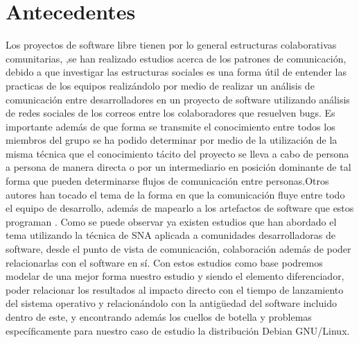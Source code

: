 \documentclass[letterpaper,12pt,titlepage]{report}
\begin{document}
\chapter{Antecedentes}
Los proyectos de software libre tienen por lo general estructuras
colaborativas comunitarias,
 ,se han realizado estudios acerca de los
patrones de comunicación, debido a que investigar las estructuras
sociales es una forma útil de entender las practicas de los equipos
realizándolo por medio de realizar un análisis de comunicación entre
desarrolladores en un proyecto de software utilizando análisis de
redes sociales de los correos entre los colaboradores que resuelven
bugs\cite{crowston2005social}.  Es importante además de que forma se
transmite el conocimiento entre todos los miembros del grupo se ha
podido determinar por medio de la utilización de la misma técnica que
el conocimiento tácito del proyecto se lleva a cabo de persona a
persona de manera directa o por un intermediario en posición dominante
de tal forma que pueden determinarse flujos de comunicación entre
personas\cite{ryan2009development}.Otros autores han tocado el tema de
la forma en que la comunicación fluye entre todo el equipo de
desarrollo, además de mapearlo a los artefactos de software que estos
programan \cite{ehrlich2007seeing}.  Como se puede observar ya existen
estudios que han abordado el tema utilizando la técnica de SNA
aplicada a comunidades desarrolladoras de software, desde el punto de
vista de comunicación, colaboración además de poder relacionarlas con
el software en sí. Con estos estudios como base podremos modelar de
una mejor forma nuestro estudio y siendo el elemento diferenciador,
poder relacionar los resultados al impacto directo con el tiempo de
lanzamiento del sistema operativo y relacionándolo con la antigüedad
del software incluido dentro de este, y encontrando además los cuellos
de botella y problemas específicamente para nuestro caso de estudio la
distribución Debian GNU/Linux.

\begin{comment}
La información en este parrafo esta bien, mi unico comentario es la
forma en la que lo escribis es un poco "al machetazo", si observas los
tres papers que referenciaste siempre van en este orden al escribir
los antecedentes: - Hechos generales aceptados en el área de
conocimiento que serán de ayuda para afirmar su teoría -e.g. que la
interacción de los desarrolladores en proyectos distribuidos es un
proceso social- - Hechos generales que hay en trabajos relacionados
-e.g. que hay estudios de proyectos de software libre como procesos
colaborativos- - Justifican el uso de la(s) técnica(s) de sus papers y
como es diferente a los trabajos relacionados -e.g. El trabajo de
Wolf(2011) demostró que se puede utilizar redes bayesianas para
predecir la influencia a futuro que tendra el retraso de X o Y
paquete, sin embargo desconsidera la relación inmediata por lo que, en
este trabajo se pretende utilizar SNA en linea con lo presentado con
los autores [98] y [99]-

Podes buscar más papers que tengan sección "Related Works" o en las
Introducciones para ver como se hace y como van de lo generalistico a
lo especifico y relacionado.
\end{comment}
\end{document}

